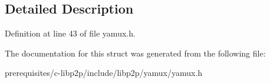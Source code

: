 \subsection{Detailed Description}


Definition at line 43 of file yamux.\+h.



The documentation for this struct was generated from the following file\+:\begin{DoxyCompactItemize}
\item 
prerequisites/c-\/libp2p/include/libp2p/yamux/yamux.\+h\end{DoxyCompactItemize}
